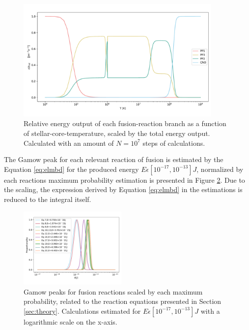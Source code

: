 \documentclass[10pt, nofootinbib, twocolumn]{revtex4-1}
\begin{document}
\begin{figure}
    \centering
    \includegraphics[width = 0.9\textwidth]{figures/energy.pdf} 
    \caption{Relative energy output of each fusion-reaction branch as a function of stellar-core-temperature, scaled by the total energy output. Calculated with an amount of $N=10^7$ steps of calculations.}
    \label{fig:enprod}
\end{figure} 

\newpage
The Gamow peak for each relevant reaction of fusion is estimated by the Equation \eqref{eq:elmbd} for the produced energy $E\epsilon [10^{-17}, 10^{-13}]J$, normalized by each reactions maximum probability estimation is presented in Figure \ref{fig:prod}. Due to the scaling, the expression derived by Equation \eqref{eq:elmbd} in the estimations is reduced to the integral itself. 
\begin{figure}[H]
    \centering
    \includegraphics[width = 0.47\textwidth]{figures/peaks.pdf} 
    \caption{Gamow peaks for fusion reactions scaled by each maximum probability, related to the reaction equations presented in Section \ref{sec:theory}. Calculations estimated for $E\epsilon [10^{-17}, 10^{-13}]J$ with a logarithmic scale on the x-axis.}
    \label{fig:prod}
\end{figure} 
\end{document}

